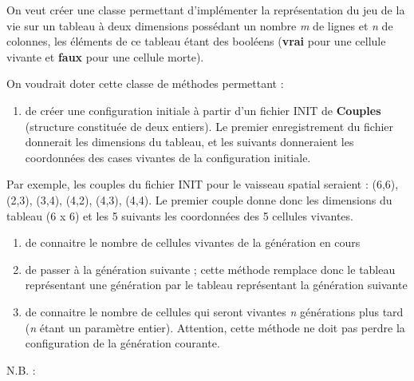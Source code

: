 \bigskip


\bigskip

{
{On veut créer une classe permettant
d’implémenter la représentation du jeu de la vie sur un tableau à deux
dimensions possédant un nombre
}{\textit{m}}{ de
lignes et
}{\textit{n}}{ de
colonnes, les éléments de ce tableau étant des booléens
(}{\textbf{vrai}}{ pour
une cellule vivante et
}{\textbf{faux}}{ pour
une cellule morte).}}

{
On voudrait doter cette classe de méthodes permettant :}

\liststyleNumberingi
\begin{enumerate}
\item {
{de créer une configuration initiale à partir
d’un fichier INIT de
}{\textbf{Couples}}{
(structure constituée de deux entiers). Le premier enregistrement du
fichier }{donnerait les dimensions du tableau,
et les suivants donneraient les coordonnées des cases vivantes de la
configuration initiale.}}
\end{enumerate}
{
Par exemple, les couples du fichier INIT pour le vaisseau spatial
seraient : (6,6), (2,3), (3,4), (4,2), (4,3), (4,4). Le premier couple
donne donc les dimensions du tableau (6 x 6) et les 5 suivants les
coordonnées des 5 cellules vivantes.}

\liststyleNumberingi
\setcounter{saveenum}{\value{enumi}}
\begin{enumerate}
\setcounter{enumi}{\value{saveenum}}
\item {
de connaitre le nombre de cellules vivantes de la génération en cours}
\item {
de passer à la génération suivante ; cette méthode remplace donc le
tableau représentant une génération par le tableau représentant la
génération suivante}
\item {
{de connaitre le nombre de cellules qui seront
vivantes }{\textit{n}}{
générations plus tard
(}{\textit{n}}{ étant
un paramètre entier). Attention, cette méthode ne doit pas perdre la
configuration de la génération courante.}}
\end{enumerate}
{
N.B. :}

